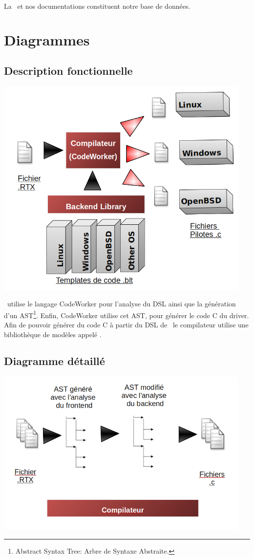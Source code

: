 \documentclass{rtxreport}
\begin{document}
La \BL\ et nos documentations constituent notre base de données.

\chapter{Diagrammes}

\section{Description fonctionnelle}

\includegraphics[width=0.95\textwidth]{diagramme_general}

\rtx\ utilise le langage CodeWorker\cite{CodeWorker} pour l'analyse du DSL ainsi
que la génération d'un AST\footnote{Abstract Syntax Tree: Arbre de Syntaxe
Abstraite.}. Enfin, CodeWorker utilise cet AST, pour générer le code C du
driver. Afin de pouvoir générer du code C à partir du DSL de \rtx\, le
compilateur utilise une bibliothèque de modèles appelé \BL.

\section{Diagramme détaillé}

\includegraphics[width=0.95\textwidth]{diagramme_fonctionel}
\end{document}
